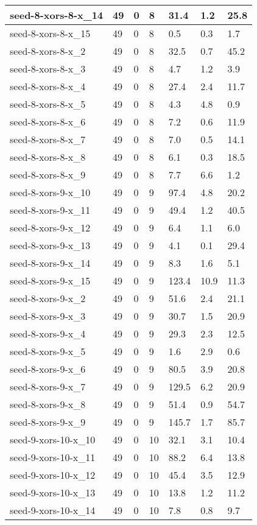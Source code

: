 \begin{scriptsize}
\begin{longtable}{|p{5cm}|l|l|l|l|l|l|}
seed-8-xors-8-x\_14&49&0&8&31.4&1.2&25.8 \\ \hline 
seed-8-xors-8-x\_15&49&0&8&0.5&0.3&1.7 \\ \hline 
seed-8-xors-8-x\_2&49&0&8&32.5&0.7&45.2 \\ \hline 
seed-8-xors-8-x\_3&49&0&8&4.7&1.2&3.9 \\ \hline 
seed-8-xors-8-x\_4&49&0&8&27.4&2.4&11.7 \\ \hline 
seed-8-xors-8-x\_5&49&0&8&4.3&4.8&0.9 \\ \hline 
seed-8-xors-8-x\_6&49&0&8&7.2&0.6&11.9 \\ \hline 
seed-8-xors-8-x\_7&49&0&8&7.0&0.5&14.1 \\ \hline 
seed-8-xors-8-x\_8&49&0&8&6.1&0.3&18.5 \\ \hline 
seed-8-xors-8-x\_9&49&0&8&7.7&6.6&1.2 \\ \hline 
seed-8-xors-9-x\_10&49&0&9&97.4&4.8&20.2 \\ \hline 
seed-8-xors-9-x\_11&49&0&9&49.4&1.2&40.5 \\ \hline 
seed-8-xors-9-x\_12&49&0&9&6.4&1.1&6.0 \\ \hline 
seed-8-xors-9-x\_13&49&0&9&4.1&0.1&29.4 \\ \hline 
seed-8-xors-9-x\_14&49&0&9&8.3&1.6&5.1 \\ \hline 
seed-8-xors-9-x\_15&49&0&9&123.4&10.9&11.3 \\ \hline 
seed-8-xors-9-x\_2&49&0&9&51.6&2.4&21.1 \\ \hline 
seed-8-xors-9-x\_3&49&0&9&30.7&1.5&20.9 \\ \hline 
seed-8-xors-9-x\_4&49&0&9&29.3&2.3&12.5 \\ \hline 
seed-8-xors-9-x\_5&49&0&9&1.6&2.9&0.6 \\ \hline 
seed-8-xors-9-x\_6&49&0&9&80.5&3.9&20.8 \\ \hline 
seed-8-xors-9-x\_7&49&0&9&129.5&6.2&20.9 \\ \hline 
seed-8-xors-9-x\_8&49&0&9&51.4&0.9&54.7 \\ \hline 
seed-8-xors-9-x\_9&49&0&9&145.7&1.7&85.7 \\ \hline 
seed-9-xors-10-x\_10&49&0&10&32.1&3.1&10.4 \\ \hline 
seed-9-xors-10-x\_11&49&0&10&88.2&6.4&13.8 \\ \hline 
seed-9-xors-10-x\_12&49&0&10&45.4&3.5&12.9 \\ \hline 
seed-9-xors-10-x\_13&49&0&10&13.8&1.2&11.2 \\ \hline 
seed-9-xors-10-x\_14&49&0&10&7.8&0.8&9.7 \\ \hline 

\end{longtable}
\end{scriptsize}
